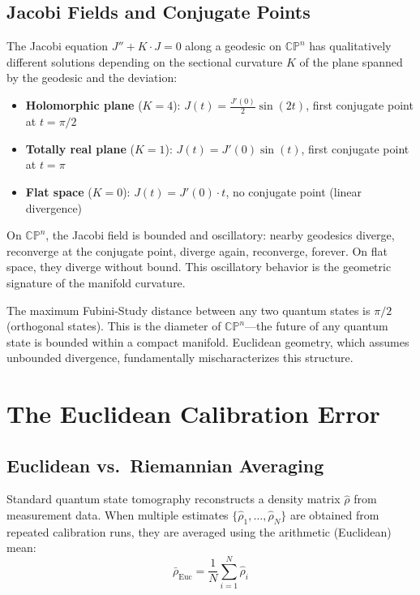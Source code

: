 \documentclass[12pt,a4paper]{article}
\begin{document}
\subsection{Jacobi Fields and Conjugate Points}

The Jacobi equation $J'' + K \cdot J = 0$ along a geodesic on $\mathbb{CP}^n$ has qualitatively different solutions depending on the sectional curvature $K$ of the plane spanned by the geodesic and the deviation:

\begin{itemize}
    \item \textbf{Holomorphic plane} ($K = 4$): $J(t) = \frac{J'(0)}{2} \sin(2t)$, first conjugate point at $t = \pi/2$
    \item \textbf{Totally real plane} ($K = 1$): $J(t) = J'(0) \sin(t)$, first conjugate point at $t = \pi$
    \item \textbf{Flat space} ($K = 0$): $J(t) = J'(0) \cdot t$, no conjugate point (linear divergence)
\end{itemize}

On $\mathbb{CP}^n$, the Jacobi field is bounded and oscillatory: nearby geodesics diverge, reconverge at the conjugate point, diverge again, reconverge, forever. On flat space, they diverge without bound. This oscillatory behavior is the geometric signature of the manifold curvature.

The maximum Fubini-Study distance between any two quantum states is $\pi/2$ (orthogonal states). This is the diameter of $\mathbb{CP}^n$---the future of any quantum state is bounded within a compact manifold. Euclidean geometry, which assumes unbounded divergence, fundamentally mischaracterizes this structure.

\section{The Euclidean Calibration Error}
\label{sec:calibration}

\subsection{Euclidean vs.\ Riemannian Averaging}

Standard quantum state tomography \cite{james2001,hradil1997} reconstructs a density matrix $\hat{\rho}$ from measurement data. When multiple estimates $\{\hat{\rho}_1, \ldots, \hat{\rho}_N\}$ are obtained from repeated calibration runs, they are averaged using the arithmetic (Euclidean) mean:
\begin{equation}
    \bar{\rho}_{\text{Euc}} = \frac{1}{N} \sum_{i=1}^N \hat{\rho}_i
\end{equation}
\end{document}
